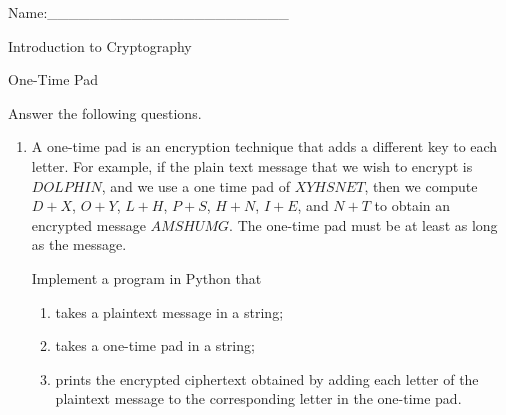 \documentclass[12pt]{amsart}
\theoremstyle{definition}
\theoremstyle{remark}
\numberwithin{equation}{section}
\begin{document}
\begin{flushright}
Name:\_\_\_\_\_\_\_\_\_\_\_\_\_\_\_\_\_\_\_\_\_\_\_
\end{flushright}
\vspace{10pt}
\begin{center}
Introduction to Cryptography

One-Time Pad
\end{center}

Answer the following questions.

\begin{enumerate}
\item A one-time pad is an encryption technique that adds a different key to each letter. For example, if the plain text message that we wish to encrypt is $DOLPHIN$, and we use a one time pad of $XYHSNET$, then we compute $D+X$, $O+Y$, $L+H$, $P+S$, $H+N$, $I+E$, and $N+T$ to obtain an encrypted message $AMSHUMG$. The one-time pad must be at least as long as the message.

Implement a program in Python that
\begin{enumerate}
\item takes a plaintext message in a string;
\item takes a one-time pad in a string;
\item prints the encrypted ciphertext obtained by adding each letter of the plaintext message to the corresponding letter in the one-time pad.
\end{enumerate}
\end{enumerate}
\vfill
\end{document}
